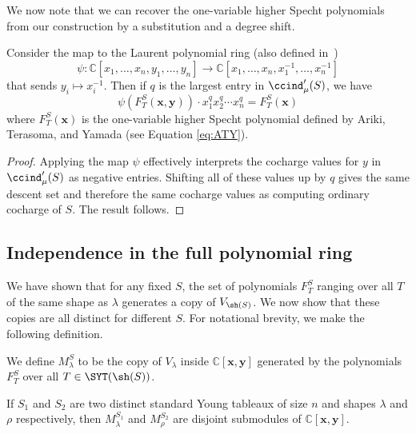We now note that we can recover the one-variable higher Specht polynomials from our construction by a substitution and a degree shift.

\begin{lemma}\label{lem:x-inverse}
	Consider the map to the Laurent polynomial ring (also defined in~\cite{HookBases}) $$\psi:\mathbb{C}[x_1,\ldots,x_n,y_1,\ldots,y_n]\to \mathbb{C}[x_1,\ldots,x_n,x_1^{-1},\ldots,x_n^{-1}]$$ that sends $y_i\mapsto x_i^{-1}$.   Then if $q$ is the largest entry in $\ccind'_\mu(S)$, we have $$\psi(F_T^S(\mathbf{x},\mathbf{y}))\cdot x_1^qx_2^q\cdots x_n^q=F_T^S(\mathbf{x})$$ where $F_T^S(\mathbf{x})$ is the one-variable higher Specht polynomial  defined by Ariki, Terasoma, and Yamada (see Equation \eqref{eq:ATY}).
\end{lemma}

\begin{proof}
	Applying the map $\psi$ effectively interprets the cocharge values for $y$ in $\ccind'_\mu(S)$ as negative entries.  Shifting all of these values up by $q$ gives the same descent set and therefore the same cocharge values as computing ordinary cocharge of $S$. The result follows.  
\end{proof}


\subsection{Independence in the full polynomial ring}

We have shown that for any fixed $S$, the set of polynomials $F_{T}^S$ ranging over all $T$ of the same shape as $\lambda$ generates a copy of $V_{\sh(S)}$.  We now show that these copies are all distinct for different $S$.  For notational brevity, we make the following definition.

\begin{definition}
	We define $M_\lambda^S$ to be the copy of $V_\lambda$ inside $\mathbb{C}[\mathbf{x},\mathbf{y}]$ generated by the polynomials $F_T^S$ over all $T\in\SYT(\sh(S))$.
\end{definition}


\begin{lemma}\label{lem:disjoint}
	If $S_1$ and $S_2$ are two distinct standard Young tableaux of size $n$ and shapes $\lambda$ and $\rho$ respectively, then $M_\lambda^{S_1}$ and $M_{\rho}^{S_2}$ are disjoint submodules of $\mathbb{C}[\mathbf{x},\mathbf{y}]$.
\end{lemma}

